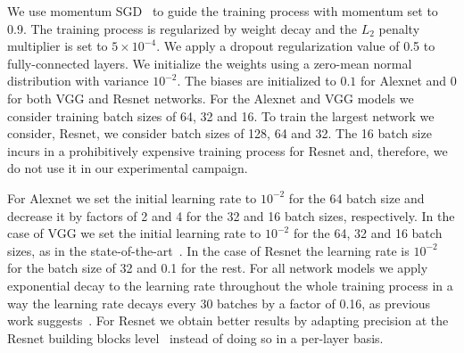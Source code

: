We use momentum SGD~\cite{momentum} to guide the training process with momentum 
set to 0.9.  The training process is regularized by weight decay and  the 
$L_{2}$ penalty multiplier is set to $5\times10^{-4}$.  We apply a dropout 
regularization value of 0.5 to fully-connected layers.
We initialize the weights using a zero-mean normal distribution with variance 
$10^{-2}$.  The biases are initialized to $0.1$ for Alexnet and $0$ for both VGG 
and Resnet networks.
For the Alexnet and VGG models we consider training batch sizes of 64, 32 and 
16.
To train the largest network we consider, Resnet, we consider batch sizes of 
128, 64 and 32.
The 16 batch size incurs in a prohibitively expensive training process for 
Resnet and, therefore, we do not use it in our experimental campaign. 
%
%

For Alexnet we set the initial learning rate to $10^{-2}$ for the 64 batch size 
and decrease it by factors of 2 and 4 for the 32 and 16 batch sizes, 
respectively.
In the case of VGG we set the initial learning rate to $10^{-2}$ for the 64, 32 
and 16 batch sizes, as in the state-of-the-art~\cite{vgg}.  In the case of 
Resnet the learning rate is $10^{-2}$ for the batch size of 32 and 0.1 for the 
rest.  For all network models we apply exponential decay to the learning rate 
throughout the whole training process in a way the learning rate decays every 30 
batches by a factor of 0.16, as previous work suggests~\cite{alexnet2}.
For Resnet we obtain better results by adapting precision at the Resnet building 
blocks level~\cite{resnet} instead of doing so in a per-layer basis.

